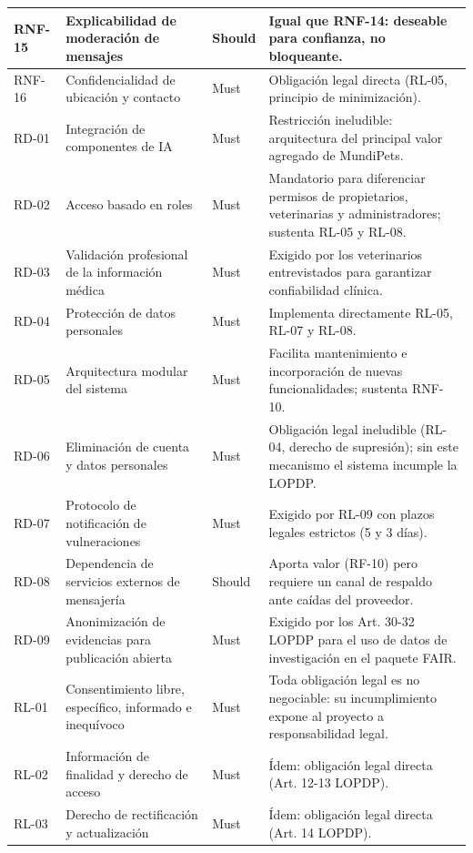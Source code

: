 \documentclass[journal,onecolumn]{IEEEtran}
\begin{document}
\begin{longtable}{@{}p{1.6cm} p{4.8cm} p{1.6cm} p{5.2cm}@{}}
		\hline
		RNF-15 & Explicabilidad de moderación de mensajes & Should & Igual que RNF-14: deseable para confianza, no bloqueante. \\
		\hline
		RNF-16 & Confidencialidad de ubicación y contacto & Must & Obligación legal directa (RL-05, principio de minimización). \\
		\hline
		RD-01 & Integración de componentes de IA & Must & Restricción ineludible: arquitectura del principal valor agregado de MundiPets. \\
		\hline
		RD-02 & Acceso basado en roles & Must & Mandatorio para diferenciar permisos de propietarios, veterinarias y administradores; sustenta RL-05 y RL-08. \\
		\hline
		RD-03 & Validación profesional de la información médica & Must & Exigido por los veterinarios entrevistados para garantizar confiabilidad clínica. \\
		\hline
		RD-04 & Protección de datos personales & Must & Implementa directamente RL-05, RL-07 y RL-08. \\
		\hline
		RD-05 & Arquitectura modular del sistema & Must & Facilita mantenimiento e incorporación de nuevas funcionalidades; sustenta RNF-10. \\
		\hline
		RD-06 & Eliminación de cuenta y datos personales & Must & Obligación legal ineludible (RL-04, derecho de supresión); sin este mecanismo el sistema incumple la LOPDP. \\
		\hline
		RD-07 & Protocolo de notificación de vulneraciones & Must & Exigido por RL-09 con plazos legales estrictos (5 y 3 días). \\
		\hline
		RD-08 & Dependencia de servicios externos de mensajería & Should & Aporta valor (RF-10) pero requiere un canal de respaldo ante caídas del proveedor. \\
		\hline
		RD-09 & Anonimización de evidencias para publicación abierta & Must & Exigido por los Art. 30-32 LOPDP para el uso de datos de investigación en el paquete FAIR. \\
		\hline
		RL-01 & Consentimiento libre, específico, informado e inequívoco & Must & Toda obligación legal es no negociable: su incumplimiento expone al proyecto a responsabilidad legal. \\
		\hline
		RL-02 & Información de finalidad y derecho de acceso & Must & Ídem: obligación legal directa (Art. 12-13 LOPDP). \\
		\hline
		RL-03 & Derecho de rectificación y actualización & Must & Ídem: obligación legal directa (Art. 14 LOPDP). \\

\end{longtable}
\end{document}
